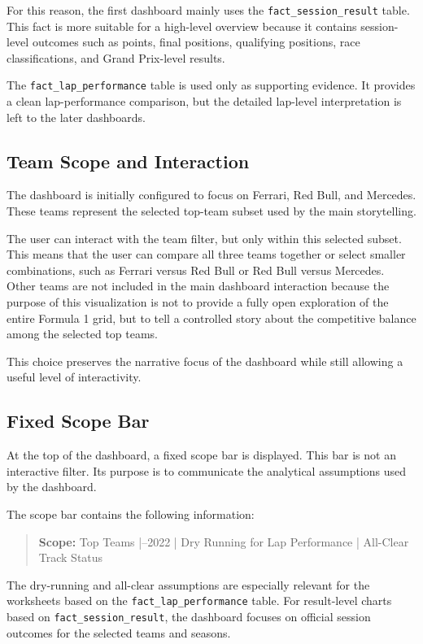 \documentclass[12pt,a4paper]{article}
\begin{document}
	For this reason, the first dashboard mainly uses the \texttt{fact\_session\_result} table.
	This fact is more suitable for a high-level overview because it contains session-level outcomes such as points, final positions, qualifying positions, race classifications, and Grand Prix-level results.
	
	The \texttt{fact\_lap\_performance} table is used only as supporting evidence.
	It provides a clean lap-performance comparison, but the detailed lap-level interpretation is left to the later dashboards.
	
	
	\subsection{Team Scope and Interaction}
	
	The dashboard is initially configured to focus on Ferrari, Red Bull, and Mercedes.
	These teams represent the selected top-team subset used by the main storytelling.
	
	The user can interact with the team filter, but only within this selected subset.
	This means that the user can compare all three teams together or select smaller combinations, such as Ferrari versus Red Bull or Red Bull versus Mercedes.
	Other teams are not included in the main dashboard interaction because the purpose of this visualization is not to provide a fully open exploration of the entire Formula 1 grid, but to tell a controlled story about the competitive balance among the selected top teams.
	
	This choice preserves the narrative focus of the dashboard while still allowing a useful level of interactivity.
	
	\subsection{Fixed Scope Bar}
	
	At the top of the dashboard, a fixed scope bar is displayed.
	This bar is not an interactive filter.
	Its purpose is to communicate the analytical assumptions used by the dashboard.
	
	The scope bar contains the following information:
	
	\begin{quote}
		\textbf{Scope:} Top Teams \;|--2022 \;|\; Dry Running for Lap Performance \;|\; All-Clear Track Status
	\end{quote}
	
	The dry-running and all-clear assumptions are especially relevant for the worksheets based on the \texttt{fact\_lap\_performance} table.
	For result-level charts based on \texttt{fact\_session\_result}, the dashboard focuses on official session outcomes for the selected teams and seasons.
	
\end{document}
